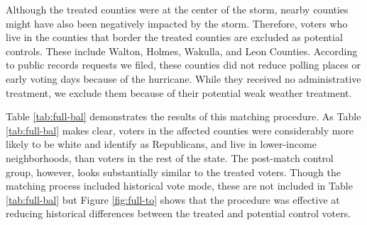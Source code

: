 \documentclass[
  12pt,
]{article}
\begin{document}
Although the treated counties were at the center of the storm, nearby counties might have also been negatively impacted by the storm. Therefore, voters who live in the counties that border the treated counties are excluded as potential controls. These include Walton, Holmes, Wakulla, and Leon Counties. According to public records requests we filed, these counties did not reduce polling places or early voting days because of the hurricane. While they received no administrative treatment, we exclude them because of their potential weak weather treatment.

Table \ref{tab:full-bal} demonstrates the results of this matching procedure. As Table \ref{tab:full-bal} makes clear, voters in the affected counties were considerably more likely to be white and identify as Republicans, and live in lower-income neighborhoods, than voters in the rest of the state. The post-match control group, however, looks substantially similar to the treated voters. Though the matching process included historical vote mode, these are not included in Table \ref{tab:full-bal} but Figure \ref{fig:full-to} shows that the procedure was effective at reducing historical differences between the treated and potential control voters.

\begin{singlespace}
\begin{table}[!h]

\caption{\label{tab:balance-tab-full}\label{tab:full-bal} Balance Table for Statewide Matching}
\centering
{}
\end{table}
\end{singlespace}
\end{document}
